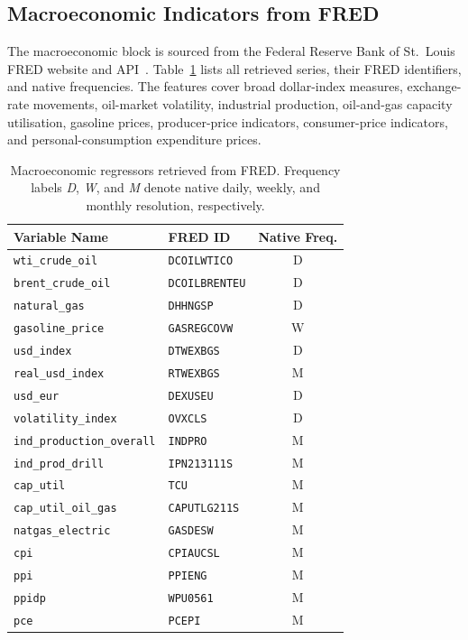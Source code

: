 \documentclass[12pt,a4paper]{article}
\begin{document}
\subsection{Macroeconomic Indicators from FRED}

The macroeconomic block is sourced from the Federal Reserve Bank of St.\ Louis FRED website and API~\citep{fred2024}. Table~\ref{tab:fred-series} lists all retrieved series, their FRED identifiers, and native frequencies. The features cover broad dollar-index measures, exchange-rate movements, oil-market volatility, industrial production, oil-and-gas capacity utilisation, gasoline prices, producer-price indicators, consumer-price indicators, and personal-consumption expenditure prices.

\begin{table}[H]
\centering
\caption{Macroeconomic regressors retrieved from FRED. Frequency labels \emph{D}, \emph{W}, and \emph{M} denote native daily, weekly, and monthly resolution, respectively.}\label{tab:fred-series}
\small
\begin{tabular}{@{}llc@{}}
\toprule
\textbf{Variable Name} & \textbf{FRED ID} & \textbf{Native Freq.}\\
\midrule
\texttt{wti\_crude\_oil}          & \texttt{DCOILWTICO}   & D \\
\texttt{brent\_crude\_oil}        & \texttt{DCOILBRENTEU} & D \\
\texttt{natural\_gas}             & \texttt{DHHNGSP}      & D \\
\texttt{gasoline\_price}          & \texttt{GASREGCOVW}   & W \\
\texttt{usd\_index}               & \texttt{DTWEXBGS}     & D \\
\texttt{real\_usd\_index}         & \texttt{RTWEXBGS}     & M \\
\texttt{usd\_eur}                 & \texttt{DEXUSEU}      & D \\
\texttt{volatility\_index}        & \texttt{OVXCLS}       & D \\
\texttt{ind\_production\_overall} & \texttt{INDPRO}       & M \\
\texttt{ind\_prod\_drill}         & \texttt{IPN213111S}   & M \\
\texttt{cap\_util}                & \texttt{TCU}          & M \\
\texttt{cap\_util\_oil\_gas}      & \texttt{CAPUTLG211S}  & M \\
\texttt{natgas\_electric}         & \texttt{GASDESW}      & M \\
\texttt{cpi}                      & \texttt{CPIAUCSL}     & M \\
\texttt{ppi}                      & \texttt{PPIENG}       & M \\
\texttt{ppidp}                    & \texttt{WPU0561}      & M \\
\texttt{pce}                      & \texttt{PCEPI}        & M \\
\bottomrule
\end{tabular}
\end{table}
\end{document}
